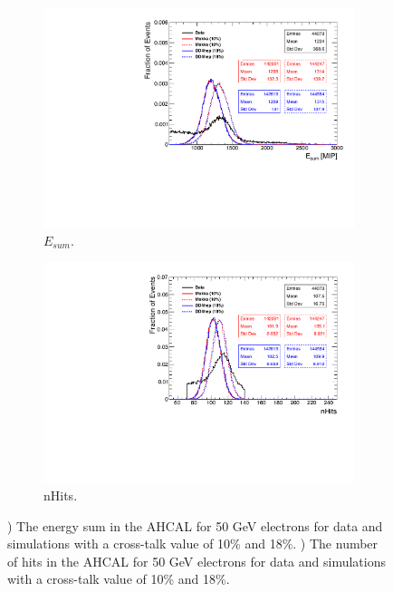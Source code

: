\begin{figure}[htbp!]
  \centering
  \begin{subfigure}[t]{0.49\textwidth}
    \includegraphics[width=1.\linewidth]{chap5/fig_AHCAL_Timing/Electrons/Comparison_EnergySum_Xtalk_electrons50GeV.pdf}
    \caption{$E_{sum}$.} \label{fig:e50Evis}
  \end{subfigure}
  \hfill
  \begin{subfigure}[t]{0.49\textwidth}
    \includegraphics[width=1.\linewidth]{chap5/fig_AHCAL_Timing/Electrons/Comparison_nHits_Xtalk_electrons50GeV.pdf}
    \caption{nHits.} \label{fig:e50nHits}
  \end{subfigure}
  \caption{) The energy sum in the AHCAL for 50 GeV electrons for data and simulations with a cross-talk value of 10\% and 18\%. ) The number of hits in the AHCAL for 50 GeV electrons for data and simulations with a cross-talk value of 10\% and 18\%.}
  \label{fig:e50Val}
\end{figure}

